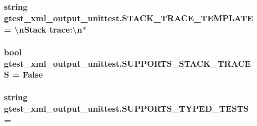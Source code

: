 \subsubsection[{\texorpdfstring{S\+T\+A\+C\+K\+\_\+\+T\+R\+A\+C\+E\+\_\+\+T\+E\+M\+P\+L\+A\+TE}{STACK_TRACE_TEMPLATE}}]{\setlength{\rightskip}{0pt plus 5cm}string gtest\+\_\+xml\+\_\+output\+\_\+unittest.\+S\+T\+A\+C\+K\+\_\+\+T\+R\+A\+C\+E\+\_\+\+T\+E\+M\+P\+L\+A\+TE = \textquotesingle{}\textbackslash{}n\+Stack {\bf trace\+:\textbackslash{}n}$\ast$\textquotesingle{}}\hypertarget{namespacegtest__xml__output__unittest_abd57c1a4124b74d2ba63d03734df491d}{}\label{namespacegtest__xml__output__unittest_abd57c1a4124b74d2ba63d03734df491d}
\subsubsection[{\texorpdfstring{S\+U\+P\+P\+O\+R\+T\+S\+\_\+\+S\+T\+A\+C\+K\+\_\+\+T\+R\+A\+C\+ES}{SUPPORTS_STACK_TRACES}}]{\setlength{\rightskip}{0pt plus 5cm}bool gtest\+\_\+xml\+\_\+output\+\_\+unittest.\+S\+U\+P\+P\+O\+R\+T\+S\+\_\+\+S\+T\+A\+C\+K\+\_\+\+T\+R\+A\+C\+ES = False}\hypertarget{namespacegtest__xml__output__unittest_af342633908d453cee6e700fe6b73ef82}{}\label{namespacegtest__xml__output__unittest_af342633908d453cee6e700fe6b73ef82}
\subsubsection[{\texorpdfstring{S\+U\+P\+P\+O\+R\+T\+S\+\_\+\+T\+Y\+P\+E\+D\+\_\+\+T\+E\+S\+TS}{SUPPORTS_TYPED_TESTS}}]{\setlength{\rightskip}{0pt plus 5cm}string gtest\+\_\+xml\+\_\+output\+\_\+unittest.\+S\+U\+P\+P\+O\+R\+T\+S\+\_\+\+T\+Y\+P\+E\+D\+\_\+\+T\+E\+S\+TS = \textquotesingle{}}\hypertarget{namespacegtest__xml__output__unittest_a07eecd027d660022c0ab447f3c3e0f2e}{}\label{namespacegtest__xml__output__unittest_a07eecd027d660022c0ab447f3c3e0f2e}
